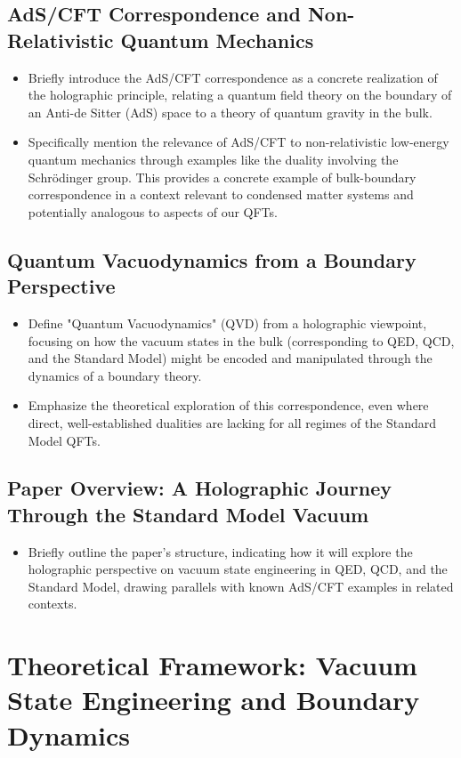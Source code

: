 \documentclass{amsart}
\begin{document}
\subsection{AdS/CFT Correspondence and Non-Relativistic Quantum Mechanics}
\begin{itemize}
    \item Briefly introduce the AdS/CFT correspondence as a concrete realization of the holographic principle, relating a quantum field theory on the boundary of an Anti-de Sitter (AdS) space to a theory of quantum gravity in the bulk.
    \item Specifically mention the relevance of AdS/CFT to non-relativistic low-energy quantum mechanics through examples like the duality involving the Schrödinger group. This provides a concrete example of bulk-boundary correspondence in a context relevant to condensed matter systems and potentially analogous to aspects of our QFTs.
\end{itemize}

\subsection{Quantum Vacuodynamics from a Boundary Perspective}
\begin{itemize}
    \item Define "Quantum Vacuodynamics" (QVD) from a holographic viewpoint, focusing on how the vacuum states in the bulk (corresponding to QED, QCD, and the Standard Model) might be encoded and manipulated through the dynamics of a boundary theory.
    \item Emphasize the theoretical exploration of this correspondence, even where direct, well-established dualities are lacking for all regimes of the Standard Model QFTs.
\end{itemize}

\subsection{Paper Overview: A Holographic Journey Through the Standard Model Vacuum}
\begin{itemize}
    \item Briefly outline the paper's structure, indicating how it will explore the holographic perspective on vacuum state engineering in QED, QCD, and the Standard Model, drawing parallels with known AdS/CFT examples in related contexts.
\end{itemize}

\section{Theoretical Framework: Vacuum State Engineering and Boundary Dynamics}
\end{document}
